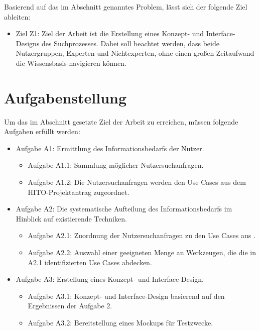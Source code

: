 Basierend auf das im Abschnitt  genanntes Problem, lässt sich der folgende Ziel ableiten:

\begin{itemize}
\item Ziel Z1: Ziel der Arbeit ist die Erstellung eines Konzept- und Interface-Designs des Suchprozesses. 
Dabei soll beachtet werden, dass beide Nutzergruppen, Experten und Nichtexperten, ohne einen großen Zeitaufwand die Wissensbasis navigieren können.
\end{itemize}

\section{Aufgabenstellung}\label{sec:aufgabenstellung}

Um das im Abschnitt  gesetzte Ziel der Arbeit zu erreichen, müssen folgende Aufgaben erfüllt werden:

\begin{itemize}
	\item Aufgabe A1: Ermittlung des Informationsbedarfs der Nutzer.
		\begin{itemize}
		\item Aufgabe A1.1: Sammlung möglicher Nutzersuchanfragen.
		\item Aufgabe A1.2: Die Nutzersuchanfragen werden den Use Cases aus dem HITO-Projektantrag zugeordnet.
		\end{itemize}
	\item Aufgabe A2: Die systematische Aufteilung des Informationsbedarfs im Hinblick auf existierende Techniken.
		\begin{itemize}
		\item Aufgabe A2.1: Zuordnung der Nutzersuchanfragen zu den Use Cases aus \citet{linkeddatavisualization}.
		\item Aufgabe A2.2: Auswahl einer geeigneten Menge an Werkzeugen, die die in A2.1 identifizierten Use Cases abdecken.
		\end{itemize}
	\item Aufgabe A3: Erstellung eines Konzept- und Interface-Design.
		\begin{itemize}
		\item Aufgabe A3.1: Konzept- und Interface-Design basierend auf den Ergebnissen der Aufgabe 2.
		\item Aufgabe A3.2: Bereitstellung eines Mockups für Testzwecke.
		\end{itemize}
\end{itemize}

